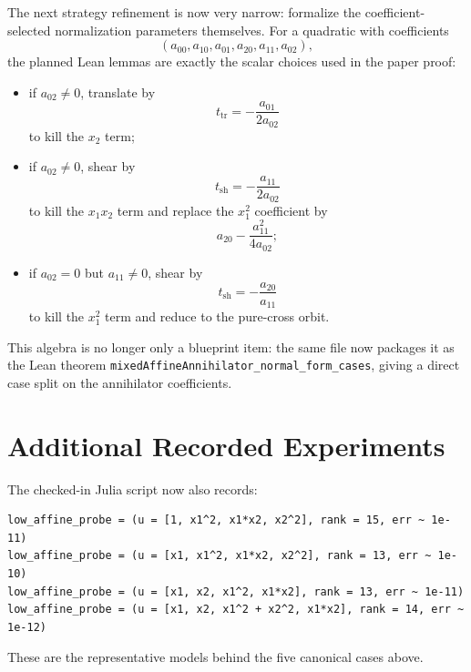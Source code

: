 \documentclass[11pt]{article}
\begin{document}
The next strategy refinement is now very narrow: formalize the coefficient-
selected normalization parameters themselves. For a quadratic with coefficients
\[
  (a_{00},a_{10},a_{01},a_{20},a_{11},a_{02}),
\]
the planned Lean lemmas are exactly the scalar choices used in the paper proof:
\begin{itemize}
\item if $a_{02}\neq 0$, translate by
  \[
    t_{\mathrm{tr}}=-\frac{a_{01}}{2a_{02}}
  \]
  to kill the $x_2$ term;
\item if $a_{02}\neq 0$, shear by
  \[
    t_{\mathrm{sh}}=-\frac{a_{11}}{2a_{02}}
  \]
  to kill the $x_1x_2$ term and replace the $x_1^2$ coefficient by
  \[
    a_{20}-\frac{a_{11}^2}{4a_{02}};
  \]
\item if $a_{02}=0$ but $a_{11}\neq 0$, shear by
  \[
    t_{\mathrm{sh}}=-\frac{a_{20}}{a_{11}}
  \]
  to kill the $x_1^2$ term and reduce to the pure-cross orbit.
\end{itemize}
This algebra is no longer only a blueprint item: the same file now packages it
as the Lean theorem
\texttt{mixedAffineAnnihilator\_normal\_form\_cases}, giving a direct case split
on the annihilator coefficients.

\section*{Additional Recorded Experiments}
The checked-in Julia script now also records:
\begin{verbatim}
low_affine_probe = (u = [1, x1^2, x1*x2, x2^2], rank = 15, err ~ 1e-11)
low_affine_probe = (u = [x1, x1^2, x1*x2, x2^2], rank = 13, err ~ 1e-10)
low_affine_probe = (u = [x1, x2, x1^2, x1*x2], rank = 13, err ~ 1e-11)
low_affine_probe = (u = [x1, x2, x1^2 + x2^2, x1*x2], rank = 14, err ~ 1e-12)
\end{verbatim}

These are the representative models behind the five canonical cases above.
\end{document}
